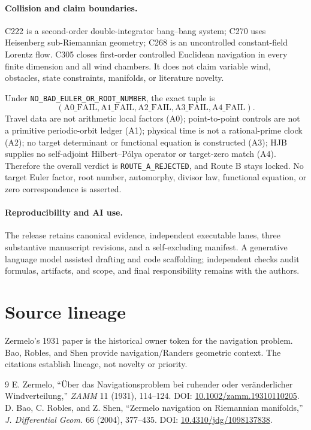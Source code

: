 \documentclass[10pt]{article}
\begin{document}
\paragraph{Collision and claim boundaries.}
C222 is a second-order double-integrator bang--bang system; C270 uses
Heisenberg sub-Riemannian geometry; C268 is an uncontrolled constant-field
Lorentz flow. C305 closes first-order controlled Euclidean navigation in
every finite dimension and all wind chambers. It
does not claim variable wind, obstacles, state constraints, manifolds, or
literature novelty.

Under \texttt{NO\_BAD\_EULER\_OR\_ROOT\_NUMBER}, the exact tuple is
\[
 (\mathrm{A0\_FAIL},\mathrm{A1\_FAIL},\mathrm{A2\_FAIL},
  \mathrm{A3\_FAIL},\mathrm{A4\_FAIL}).
\]
Travel data are not arithmetic local factors (A0); point-to-point controls
are not a primitive periodic-orbit ledger (A1); physical time is not a
rational-prime clock (A2); no target determinant or functional equation is
constructed (A3); HJB supplies no self-adjoint Hilbert--P\'olya operator or
target-zero match (A4). Therefore the overall verdict is
\texttt{ROUTE\_A\_REJECTED}, and Route B stays locked. No target Euler
factor, root number, automorphy, divisor law, functional equation, or zero
correspondence is asserted.

\paragraph{Reproducibility and AI use.}
The release retains canonical evidence, independent executable lanes, three
substantive manuscript revisions, and a self-excluding manifest. A
generative language model assisted drafting and code scaffolding;
independent checks audit formulas, artifacts, and scope, and final
responsibility remains with the authors.
\fi

\section*{Source lineage}
Zermelo's 1931 paper is the historical owner token for the navigation
problem. Bao, Robles, and Shen provide navigation/Randers geometric context.
The citations establish lineage, not novelty or priority.

\begin{thebibliography}{9}
 E. Zermelo,
``Über das Navigationsproblem bei ruhender oder veränderlicher
Windverteilung,'' \emph{ZAMM} 11 (1931), 114--124.
DOI: \href{https://doi.org/10.1002/zamm.19310110205}{10.1002/zamm.19310110205}.
 D. Bao, C. Robles, and Z. Shen,
``Zermelo navigation on Riemannian manifolds,''
\emph{J. Differential Geom.} 66 (2004), 377--435.
DOI: \href{https://doi.org/10.4310/jdg/1098137838}{10.4310/jdg/1098137838}.
\end{thebibliography}
\end{document}
